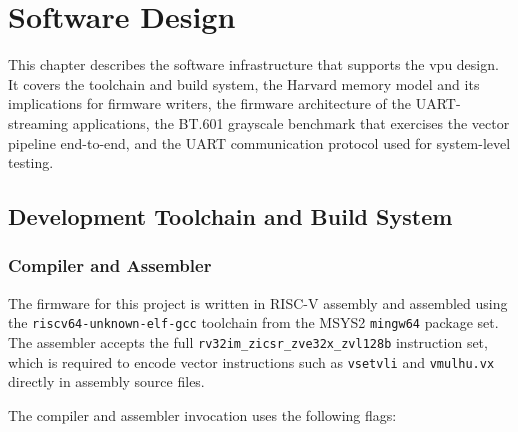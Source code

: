 \chapter{Software Design}
\label{ch:software}

This chapter describes the software infrastructure that supports the \gls{vpu} design.
It covers the toolchain and build system, the Harvard memory model and its implications
for firmware writers, the firmware architecture of the UART-streaming applications, the
BT.601 grayscale benchmark that exercises the vector pipeline end-to-end, and the UART
communication protocol used for system-level testing.

\section{Development Toolchain and Build System}
\label{sec:toolchain}

\subsection{Compiler and Assembler}

The firmware for this project is written in RISC-V assembly and assembled using the
\texttt{riscv64-unknown-elf-gcc} toolchain from the MSYS2 \texttt{mingw64} package set.
The assembler accepts the full \texttt{rv32im\_zicsr\_zve32x\_zvl128b} instruction set,
which is required to encode vector instructions such as \texttt{vsetvli} and
\texttt{vmulhu.vx} directly in assembly source files.

The compiler and assembler invocation uses the following flags:

